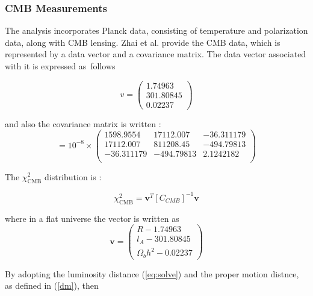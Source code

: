\documentclass[universe,article,accept,moreauthors,pdftex]{Definitions/mdpi}
\begin{document}
 

\subsubsection{CMB Measurements}


The analysis incorporates Planck data, consisting of temperature and polarization data, along with CMB lensing. Zhai et al. \cite{Zhai:2018vmm} provide the CMB data, which is represented by a data vector and a covariance matrix. The data vector associated with it is expressed \mbox{as follows}

\begin{equation}
v = 
 \begin{pmatrix}
 1.74963\\
301.80845\\
0.02237
 \end{pmatrix}\end{equation}

and also the covariance matrix is written \cite{Zhai:2018vmm}: 
 \begin{equation}
 [C_{CMB}]=10^{-8} \times
 \begin{pmatrix}
  1598.9554 & 17112.007 & -36.311179  \\
  17112.007 & 811208.45 &  -494.79813   \\
  -36.311179  & -494.79813  & 2.1242182   \\
\end{pmatrix}
 \end{equation}
 
  
 
  
The $\chi^{2}_{\text{CMB}}$ distribution is \cite{Zhai:2018vmm}:

  \begin{equation}
      \chi^{2}_{\text{CMB}}=\textbf{v}^{T}[C_{ CMB}]^{-1}\textbf{v}
      \end{equation}

 where in a flat universe the vector is written as \cite{Zhai:2018vmm} 
\begin{equation}
\textbf{v} = 
 \begin{pmatrix}
  R-1.74963  \\
  l_{A}-301.80845\\
  \Omega_{b}h^{2}-0.02237
 \end{pmatrix}\end{equation}
 
By adopting the luminosity distance (\ref{eq:solve}) and  the proper motion distnce, as defined in (\ref{dm}), then
\end{document}

